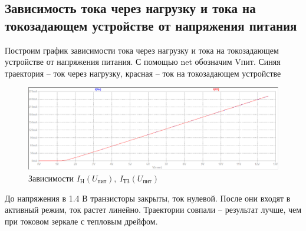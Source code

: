 \documentclass[a4paper, 12pt]{article}
\begin{document}
    \subsection{Зависимость тока через нагрузку и тока на токозадающем устройстве от напряжения питания}
    Построим график зависимости тока через нагрузку и тока на токозадающем устройстве от напряжения питания.
    С помощью net обозначим Vпит. Синяя траектория -- ток через нагрузку,
    красная -- ток на токозадающем устройстве
    \begin{figure}[H]
        \centering
        \includegraphics[scale=0.46]{2task_Iн(Vпит)_Iтз(Vпит).png}
        \captionsetup{skip=0pt}
        \caption{Зависимости $I_\text{Н}\left( U_\text{пит} \right),\ I_\text{ТЗ}\left( U_\text{пит} \right)$}
        \label{fig:2task_InVl_ItzVl}
    \end{figure}
    \noindent До напряжения в 1.4 В транзисторы закрыты, ток нулевой. После они входят в активный режим,
    ток растет линейно. Траектории совпали -- результат лучше, чем при токовом зеркале с тепловым дрейфом.
\end{document}
